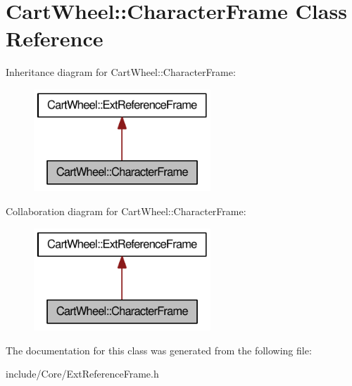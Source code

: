 \hypertarget{classCartWheel_1_1CharacterFrame}{
\section{CartWheel::CharacterFrame Class Reference}
\label{classCartWheel_1_1CharacterFrame}
}


Inheritance diagram for CartWheel::CharacterFrame:\nopagebreak
\begin{figure}[H]
\begin{center}
\leavevmode
\includegraphics[width=188pt]{classCartWheel_1_1CharacterFrame__inherit__graph}
\end{center}
\end{figure}


Collaboration diagram for CartWheel::CharacterFrame:\nopagebreak
\begin{figure}[H]
\begin{center}
\leavevmode
\includegraphics[width=188pt]{classCartWheel_1_1CharacterFrame__coll__graph}
\end{center}
\end{figure}


The documentation for this class was generated from the following file:\begin{DoxyCompactItemize}
\item 
include/Core/ExtReferenceFrame.h\end{DoxyCompactItemize}
